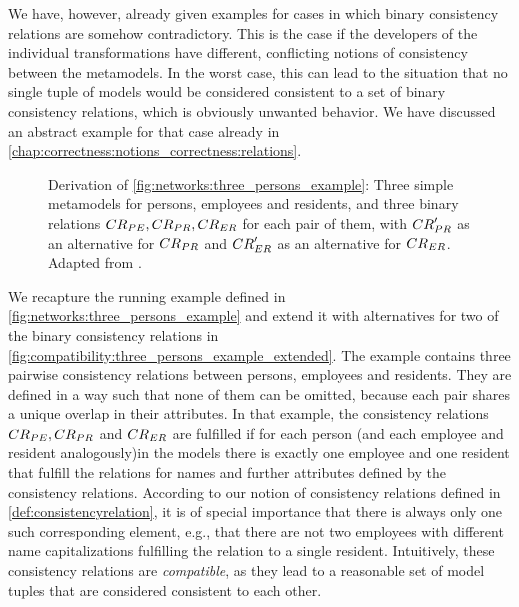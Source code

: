 We have, however, already given examples for cases in which binary consistency relations are somehow contradictory.
This is the case if the developers of the individual transformations have different, conflicting notions of consistency between the metamodels.
In the worst case, this can lead to the situation that no single tuple of models would be considered consistent to a set of binary consistency relations, which is obviously unwanted behavior.
We have discussed an abstract example for that case already in \autoref{chap:correctness:notions_correctness:relations}.

\begin{figure}
    \centering
    
    \caption[Three metamodels with (in)compatible consistency relations]{Derivation of \autoref{fig:networks:three_persons_example}: Three simple metamodels for persons, employees and residents, and three binary relations $\consistencyrelation{CR}{PE}, \consistencyrelation{CR}{PR}, \consistencyrelation{CR}{ER}$ for each pair of them, with $\consistencyrelation{CR}{PR}'$ as an alternative for $\consistencyrelation{CR}{PR}$ and $\consistencyrelation{CR}{ER}'$ as an alternative for $\consistencyrelation{CR}{ER}$. Adapted from .}
    \label{fig:compatibility:three_persons_example_extended}
\end{figure}

We recapture the running example defined in \autoref{fig:networks:three_persons_example} and extend it with alternatives for two of the binary consistency relations in \autoref{fig:compatibility:three_persons_example_extended}.
The example contains three pairwise consistency relations between persons, employees and residents.
They are defined in a way such that none of them can be omitted, because each pair shares a unique overlap in their attributes.
In that example, the consistency relations $\consistencyrelation{CR}{PE}, \consistencyrelation{CR}{PR}$ and $\consistencyrelation{CR}{ER}$ are fulfilled if for each person (and each employee and resident analogously)in the models there is exactly one employee and one resident that fulfill the relations for names and further attributes defined by the consistency relations.
According to our notion of consistency relations defined in \autoref{def:consistencyrelation}, it is of special importance that there is always only one such corresponding element, e.g., that there are not two employees with different name capitalizations fulfilling the relation to a single resident.
Intuitively, these consistency relations are \emph{compatible}, as they lead to a reasonable set of model tuples that are considered consistent to each other.

